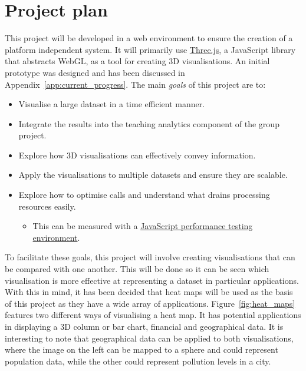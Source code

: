 \documentclass[
	fontsize=11pt
	headlines=2,
	footlines=2,
	parskip=half
]{scrartcl}
\begin{document}
	\section{Project plan} {
	\label{sec:project_plan}
		
		This project will be developed in a web environment to ensure the creation of a platform independent system. It will primarily use \href{http://threejs.org/}{Three.js}, a JavaScript library that abstracts WebGL, as a tool for creating 3D visualisations. An initial prototype was designed and has been discussed in Appendix~\ref{app:current_progress}. The main \emph{goals} of this project are to:

		\begin{itemize}
			\item Visualise a large dataset in a time efficient manner.
			\item Integrate the results into the teaching analytics component of the group project.
			\item Explore how 3D visualisations can effectively convey information.
			\item Apply the visualisations to multiple datasets and ensure they are scalable.
			\item Explore how to optimise calls and understand what drains processing resources easily.
			\begin{itemize}
				\item This can be measured with a \href{http://jsperf.com/}{JavaScript performance testing environment}.
			\end{itemize}
		\end{itemize}
		
		To facilitate these goals, this project will involve creating visualisations that can be compared with one another. This will be done so it can be seen which visualisation is more effective at representing a dataset in particular applications. With this in mind, it has been decided that heat maps will be used as the basis of this project as they have a wide array of applications. Figure~\ref{fig:heat_maps} features two different ways of visualising a heat map. It has potential applications in displaying a 3D column or bar chart, financial and geographical data. It is interesting to note that geographical data can be applied to both visualisations, where the image on the left can be mapped to a sphere and could represent population data, while the other could represent pollution levels in a city.
		
}
\end{document}
